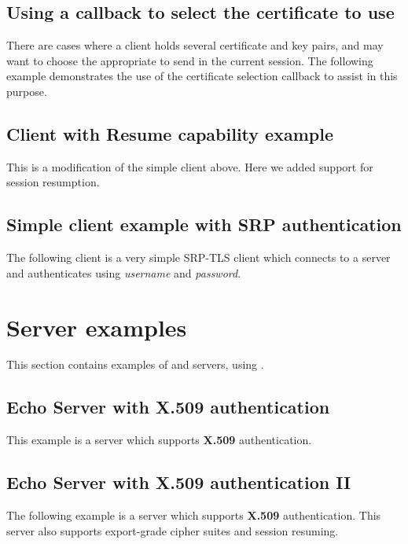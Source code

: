 

\subsection{Using a callback to select the certificate to use}
There are cases where a client holds several certificate and key pairs,
and may want to choose the appropriate to send in the current session.
The following example demonstrates the use of the certificate selection callback
to assist in this purpose.
\par




\subsection{Client with Resume capability example}
\label{resume-example}
This is a modification of the simple client above. Here we added support 
for session resumption.


\subsection{Simple client example with SRP authentication}
The following client
is a very simple SRP-TLS client which connects to a server 
and authenticates using {\it username} and {\it password}.



\section{Server examples}
This section contains examples of \tls{} and \ssl{} servers, using \gnutls{}.

\subsection{Echo Server with X.509 authentication}
This example is a server which supports {\bf X.509} authentication.


\subsection{Echo Server with X.509 authentication II}
The following example is a server which supports {\bf X.509} authentication.
This server also supports export-grade cipher suites and session resuming.


